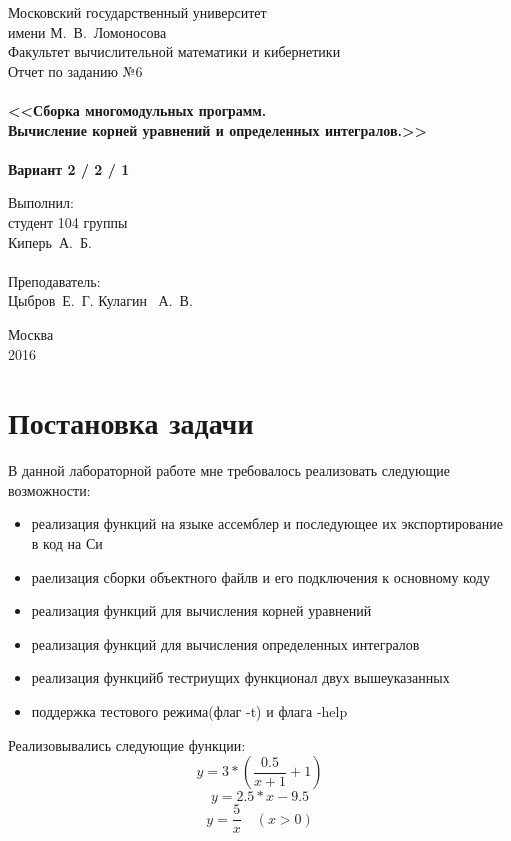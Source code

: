 \documentclass[a4paper,12pt,titlepage,finall]{article}
\begin{document}
\begin{titlepage}
    \begin{center}
	{\small \sc Московский государственный университет \\имени М.~В.~Ломоносова\\
	Факультет вычислительной математики и кибернетики\\}
	\vfill
	{\Large \sc Отчет по заданию №6}\\
	~\\
	{\large \bf <<Сборка многомодульных программ. \\
	Вычисление корней уравнений и определенных интегралов.>>}\\ 
	~\\
	{\large \bf Вариант 2 / 2 / 1}
    \end{center}
    \begin{flushright}
	\vfill {Выполнил:\\
	студент 104 группы\\
	Киперь~А.~Б.\\
	~\\
	Преподаватель:\\
	Цыбров~Е.~Г. Кулагин ~А.~В.}
    \end{flushright}
    \begin{center}
	\vfill
	{\small Москва\\2016}
    \end{center}
\end{titlepage}

\tableofcontents
\newpage

\section{Постановка задачи}

В данной лабораторной работе мне требовалось реализовать следующие возможности:
\begin{itemize}
    \item реализация функций на языке ассемблер и последующее их экспортирование в код на Си
    \item раелизация сборки объектного файлв и его подключения к основному коду
    \item реализация функций для вычисления корней уравнений
    \item реализация функций для вычисления определенных интегралов
    \item реализация функцийб тестриущих функционал двух вышеуказанных
    \item поддержка тестового режима(флаг -t) и флага -help
\end{itemize}
Реализовывались следующие функции: \\
\[
y = 3 * \left(\frac{0.5}{x+1} + 1\right)
\]
\[
y = 2.5 * x - 9.5
\]
\[
y = \frac{5}{x} \quad (x > 0)
\]
\end{document}
